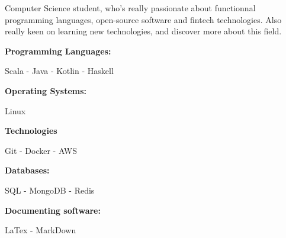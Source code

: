\documentclass[10pt]{developercv} %
\begin{document}
\begin{minipage}[t]{0.4\textwidth} %
	
    \vspace{-\baselineskip} %
	
    {Computer Science student, who's really passionate about functionnal programming languages, 
    open-source software and fintech technologies.
    \newline Also really keen on learning new technologies, and discover more about this field. 
	}%
\end{minipage}
\hfill %
\begin{minipage}[t]{0.575\textwidth} %
   
	\vspace{-\baselineskip} %
	    \begin{minipage}[t]{0.475 \textwidth}
	 		\textbf{Programming Languages:}
            
    		{Scala - Java - Kotlin - Haskell}

    		\textbf{Operating Systems:}

    		{Linux}

            \textbf{Technologies}

            {Git - Docker - AWS}
	    \end{minipage}
        \hfill
	    \begin{minipage}[t]{0.5 \textwidth}
	 		\textbf{Databases:}

            {SQL - MongoDB - Redis}

       		\textbf{Documenting software:}

    		{LaTex - MarkDown}
        \end{minipage}
\end{minipage}


\end{document}

